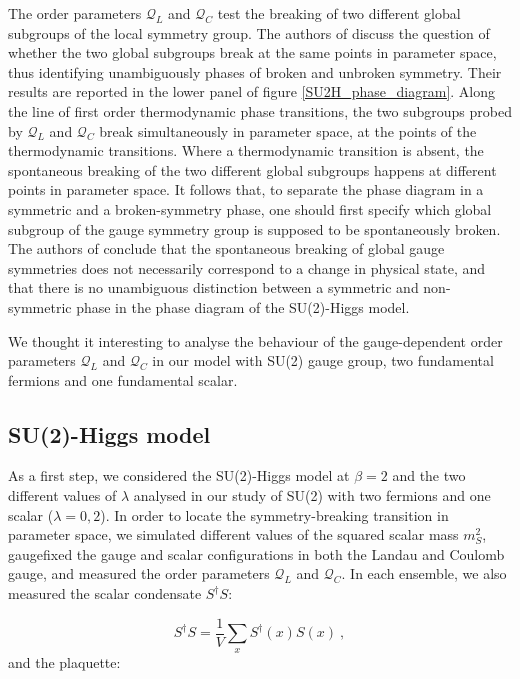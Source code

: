 The order parameters $\mathcal Q_L$ and $\mathcal Q_C$ test the breaking of two different global subgroups of the local symmetry group. The authors of \cite{Caudy:2007sf} discuss the question of whether the two global subgroups break at the same points in parameter space, thus identifying unambiguously phases of broken and unbroken symmetry. Their results are reported in the lower panel of figure \ref{SU2H_phase_diagram}. Along the line of first order thermodynamic phase transitions, the two subgroups probed by $\mathcal Q_L$ and $\mathcal Q_C$ break simultaneously in parameter space, at the points of the thermodynamic transitions. Where a thermodynamic transition is absent, the spontaneous breaking of the two different global subgroups happens at different points in parameter space. It follows that, to separate the phase diagram in a symmetric and a broken-symmetry phase, one should first specify which global subgroup of the gauge symmetry group is supposed to be spontaneously broken. The authors of \cite{Caudy:2007sf} conclude that the spontaneous breaking of global gauge symmetries does not necessarily correspond to a change in physical state, and that there is no unambiguous distinction between a symmetric and non-symmetric phase in the phase diagram of the SU(2)-Higgs model.

We thought it interesting to analyse the behaviour of the gauge-dependent order parameters $\mathcal Q_L$ and $\mathcal Q_C$ in our model with SU(2) gauge group, two fundamental fermions and one fundamental scalar.

\subsection{SU(2)-Higgs model}

As a first step, we considered the SU(2)-Higgs model at $\beta = 2$ and the two different values of $\lambda$ analysed in our study of SU(2) with two fermions and one scalar ($\lambda = 0, 2$). In order to locate the symmetry-breaking transition in parameter space, we simulated different values of the squared scalar mass $m_S^2$, gaugefixed the gauge and scalar configurations in both the Landau and Coulomb gauge, and measured the order parameters $\mathcal Q_L$ and $\mathcal Q_C$. In each ensemble, we also measured the scalar condensate $S^{\dagger} S$:

\begin{equation}
S^{\dagger} S = \frac{1}{V} \sum_x S^{\dagger}(x) S(x) \: ,
\end{equation}
%
and the plaquette:

